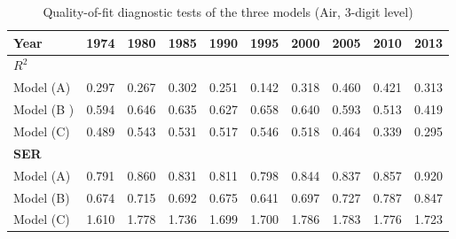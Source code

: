 \documentclass[11pt,twoside, authoryear]{elsarticle}
\begin{document}
\begin{landscape}
\begin{table}[htbp]
  \centering
  \footnotesize{
  \caption{Quality-of-fit diagnostic tests of the three models (Air, 3-digit level)}
    \label{tab:3models_diagnosis_air}%
   \begin{tabular}{l|c|c|c|c|c|c|c|c|c}
    \hline \hline
    \textbf{Year} & \multicolumn{1}{c}{\textbf{1974}} & \multicolumn{1}{c}{\textbf{1980}} & \multicolumn{1}{c}{\textbf{1985}} & \multicolumn{1}{c}{\textbf{1990}} & \multicolumn{1}{c}{\textbf{1995}} & \multicolumn{1}{c}{\textbf{2000}} & \multicolumn{1}{c}{\textbf{2005}} & \multicolumn{1}{c}{\textbf{2010}} & \multicolumn{1}{c}{\textbf{2013}} \\ \hline
    \multicolumn{10}{l}{\textbf{$R^2$}} \\ \hline
    Model (A) & \multicolumn{1}{c}{0.297} & \multicolumn{1}{c}{0.267} & \multicolumn{1}{c}{0.302} & \multicolumn{1}{c}{0.251} & \multicolumn{1}{c}{0.142} & \multicolumn{1}{c}{0.318} & \multicolumn{1}{c}{0.460} & \multicolumn{1}{c}{0.421} & \multicolumn{1}{c}{0.313} \\
    Model (B ) & \multicolumn{1}{c}{0.594} & \multicolumn{1}{c}{0.646} & \multicolumn{1}{c}{0.635} & \multicolumn{1}{c}{0.627} & \multicolumn{1}{c}{0.658} & \multicolumn{1}{c}{0.640} & \multicolumn{1}{c}{0.593} & \multicolumn{1}{c}{0.513} & \multicolumn{1}{c}{0.419} \\
    Model (C) & \multicolumn{1}{c}{0.489} & \multicolumn{1}{c}{0.543} & \multicolumn{1}{c}{0.531} & \multicolumn{1}{c}{0.517} & \multicolumn{1}{c}{0.546} & \multicolumn{1}{c}{0.518} & \multicolumn{1}{c}{0.464} & \multicolumn{1}{c}{0.339} & \multicolumn{1}{c}{0.295} \\ \hline
    \multicolumn{10}{l}{\textbf{SER}}\\ \hline
    Model (A) & \multicolumn{1}{c}{0.791} & \multicolumn{1}{c}{0.860} & \multicolumn{1}{c}{0.831} & \multicolumn{1}{c}{0.811} & \multicolumn{1}{c}{0.798} & \multicolumn{1}{c}{0.844} & \multicolumn{1}{c}{0.837} & \multicolumn{1}{c}{0.857} & \multicolumn{1}{c}{0.920} \\
    Model (B) & \multicolumn{1}{c}{0.674} & \multicolumn{1}{c}{0.715} & \multicolumn{1}{c}{0.692} & \multicolumn{1}{c}{0.675} & \multicolumn{1}{c}{0.641} & \multicolumn{1}{c}{0.697} & \multicolumn{1}{c}{0.727} & \multicolumn{1}{c}{0.787} & \multicolumn{1}{c}{0.847} \\
    Model (C) & \multicolumn{1}{c}{1.610} & \multicolumn{1}{c}{1.778} & \multicolumn{1}{c}{1.736} & \multicolumn{1}{c}{1.699} & \multicolumn{1}{c}{1.700} & \multicolumn{1}{c}{1.786} & \multicolumn{1}{c}{1.783} & \multicolumn{1}{c}{1.776} & \multicolumn{1}{c}{1.723} \\ \hline

\end{tabular}}
\end{table}
\end{landscape}
\end{document}
